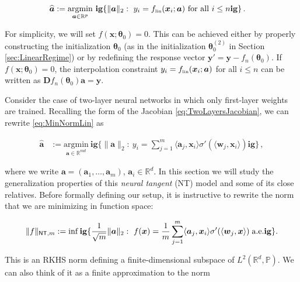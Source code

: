 \begin{align}
  {\widehat {\boldsymbol a}} &:= \underset{{\boldsymbol a}\in{\mathbb R}^p}{\mathrm{argmin}} \ \mathbf{ig}\{\|{\boldsymbol a}\|_2:~  y_i=f_{\mbox{\rm\tiny lin}}({\boldsymbol x}_i;{\boldsymbol a}) ~\text{for all}~ i\le n\mathbf{ig}\}\, .\label{eq:MinNormLin}
\end{align}

For simplicity, we will set $f({\boldsymbol x};{\boldsymbol \theta}_0)=0$. This can be achieved either by properly constructing the initialization ${\boldsymbol \theta}_0$
(as in the initialization ${\boldsymbol \theta}_0^{(2)}$ in Section \ref{sec:LinearRegime}) or by redefining the response vector ${\boldsymbol y}' ={\boldsymbol y}-f_n({\boldsymbol \theta}_0)$.
If  $f({\boldsymbol x};{\boldsymbol \theta}_0)=0$, the interpolation constraint  $y_i=f_{\mbox{\rm\tiny lin}}({\boldsymbol x}_i;{\boldsymbol a})$ for all $i\le n$  can be written as ${\boldsymbol D} f_n({\boldsymbol \theta}_0){\boldsymbol a}={\boldsymbol y}$.

Consider the case of two-layer neural networks in which only first-layer weights are trained.  Recalling the form of the Jacobian \eqref{eq:TwoLayersJacobian}, we can rewrite \eqref{eq:MinNormLin} as

\begin{align}
  {\widehat {\boldsymbol a}} &:= \underset{{\boldsymbol a}\in{\mathbb R}^{md}}{\mathrm{argmin}} \ \mathbf{ig}\{\|{\boldsymbol a}\|_2:~ y_i=\sum_{j=1}^m\langle{\boldsymbol a}_j,{\boldsymbol x}_i\rangle\sigma'(\langle{\boldsymbol w}_j,{\boldsymbol x}_i\rangle)\mathbf{ig}\}\, ,
\end{align}

where we write ${\boldsymbol a}=({\boldsymbol a}_1,\dots,{\boldsymbol a}_m)$, ${\boldsymbol a}_i\in{\mathbb R}^d$. In this section we will study the generalization properties of this
{\em neural tangent} (NT) model and some of its close relatives. Before formally defining our setup, it is instructive to rewrite the norm that we are minimizing in function space:

\begin{align}
  \label{eq:NT_Norm_m}
  \|f\|_{{\sf NT},m}:= \inf\mathbf{ig}\{\frac{1}{\sqrt{m}}\|{\boldsymbol a}\|_2:~ f({\boldsymbol x})=\frac{1}{m}\sum_{j=1}^m\langle{\boldsymbol a}_j,{\boldsymbol x}_i\rangle\sigma'(\langle{\boldsymbol w}_j,{\boldsymbol x}\rangle)\; \mbox{a.e.}
  \mathbf{ig}\}.
\end{align}

This is an RKHS norm defining  a finite-dimensional subspace of
$L^2({\mathbb R}^d,\mathbb{P})$.
We can also think of it as a finite approximation to the norm

